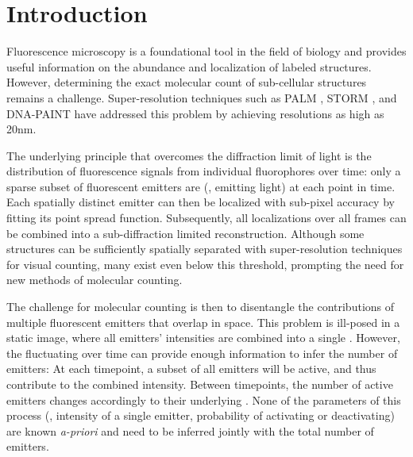 \section{Introduction}

%
Fluorescence microscopy is a foundational tool in the field of biology and
provides useful information on the abundance and localization of labeled
structures.
%
  However, determining the exact molecular count of sub-cellular structures remains a
  challenge. Super-resolution techniques such as PALM \cite{betzig_imaging_2006},
  STORM \cite{rust_sub-diffraction-limit_2006}, and DNA-PAINT
  \cite{schnitzbauer_super-resolution_2017} have addressed this problem by
  achieving resolutions as high as 20nm.

%
The underlying principle that overcomes the diffraction limit of light is the
distribution of fluorescence signals from individual fluorophores over time:
%
  only a sparse subset of fluorescent emitters are 
  (\ie, emitting light) at each point in time.
  Each spatially distinct emitter can then be localized with sub-pixel accuracy
  by fitting its point spread function. Subsequently, all localizations over
  all frames can be combined into a sub-diffraction limited reconstruction.
  Although some structures can be sufficiently spatially separated with
  super-resolution techniques for visual counting, many exist even below this
  threshold, prompting the need for new methods of molecular counting.

%
The challenge for molecular counting is then to disentangle the contributions
of multiple fluorescent emitters that overlap in space.
%
  This problem is ill-posed in a static image, where all emitters' intensities
  are combined into a single . However, the fluctuating
   over time can provide enough information to infer
  the number of emitters:
  At each timepoint, a subset of all emitters will be active, and thus
  contribute to the combined intensity. Between timepoints, the number of
  active emitters changes accordingly to their underlying .
  None of the parameters of this process (\eg, intensity of a single emitter,
  probability of activating or deactivating) are known \emph{a-priori} and need
  to be inferred jointly with the total number of emitters.

